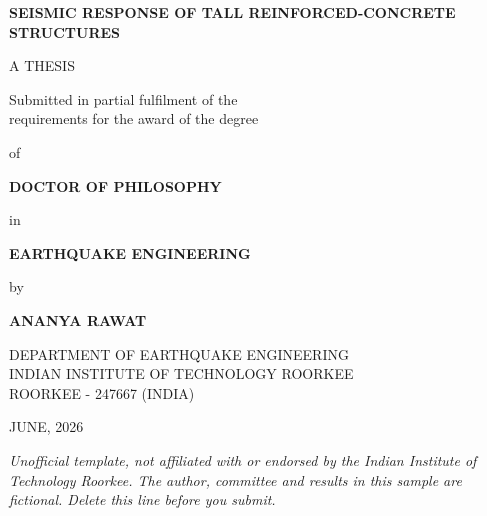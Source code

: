 \begin{titlepage}
\centering
\begin{singlespace}
\vspace*{0.4in}
{\large\bfseries\MakeUppercase{Seismic Response of Tall Reinforced-Concrete Structures}\par}
\vspace{0.8in}
A THESIS\par\vspace{0.2in}
Submitted in partial fulfilment of the\\
requirements for the award of the degree\par\vspace{0.2in}
of\par\vspace{0.2in}
{\bfseries DOCTOR OF PHILOSOPHY}\par\vspace{0.1in}
in\par\vspace{0.1in}
{\bfseries EARTHQUAKE ENGINEERING}\par\vspace{0.3in}
by\par\vspace{0.1in}
{\bfseries\MakeUppercase{Ananya Rawat}}\par\vspace{0.8in}
\MakeUppercase{Department of Earthquake Engineering}\\
INDIAN INSTITUTE OF TECHNOLOGY ROORKEE\\
ROORKEE - 247667 (INDIA)\par\vspace{0.2in}
\MakeUppercase{June}, 2026
\end{singlespace}
\vfill
{\footnotesize\itshape Unofficial template, not affiliated with or endorsed by the Indian Institute of Technology Roorkee. The author, committee and results in this sample are fictional. Delete this line before you submit.}
\end{titlepage}
